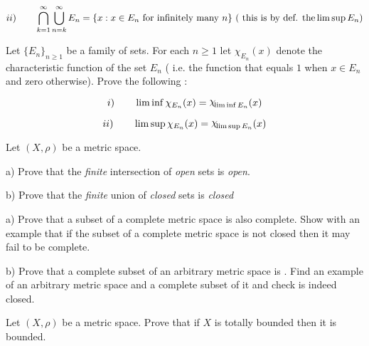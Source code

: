   $$ ii)  \qquad \bigcap_{k=1}^{\infty} \bigcup_{n=k}^{\infty} E_n = \{ x
: x \in E_n \text{ for infinitely many} \, \,  n \} \, \, (\text{ {\rm this
is by def. the}} \limsup  E_n ) $$
\endproclaim


  Let $\{E_n\}_{n\ge 1}$ be a family of sets. For
each $n \ge 1$ let $\chi_{E_n} (x)$ denote the characteristic function
of the set $E_n$ ( i.e. the function that equals $1$ when $x \in E_n$
and zero otherwise). Prove the following :

$$ i)\qquad \liminf \chi_{E_n} (x) = \ch_{\liminf E_n} (x) $$


$$ ii) \qquad \limsup \chi_{E_n} (x) = \ch_{\limsup E_n} (x) $$ 

\endproclaim 

 Let $(X, \rho)$ be a metric space.  

a) Prove that the {\it finite} intersection of {\it open } sets is {\it open}. 

b) Prove that the  {\it finite} union of {\it closed} sets is {\it
closed} 

\endproclaim




a) Prove that a  subset of a complete metric space is also complete. Show with an example that if the subset of a complete metric space 
is not closed then it may fail to be complete.

b) Prove that a complete subset of an arbitrary metric space is . 
Find an example of an arbitrary metric space and a complete 
subset of it and check is indeed closed. 

\endproclaim


 Let $(X, \rho)$ be a metric space. Prove that if $X$ is 
totally bounded then it  is bounded. 

\endproclaim











\enddocument























